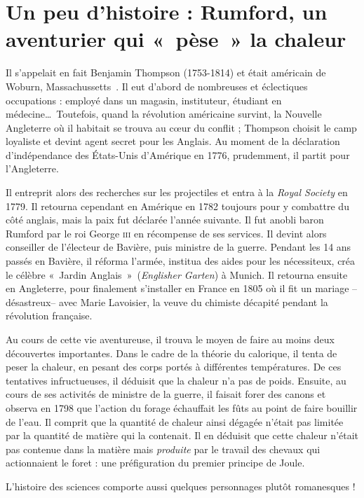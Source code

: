 \atstartofhistorysection
\section[Un peu d’histoire : l’aventurier Rumford]{Un peu d’histoire :\onlyamphibook{\\} Rumford, un aventurier qui «~pèse~» la chaleur}
\label{ch_histoire_rumford_depondt}


	Il s'appelait en fait Benjamin Thompson (1753-1814) et était américain de Woburn, Massachussetts~\cite{millar1996}. Il eut d'abord de nombreuses et éclectiques occupations : employé dans un magasin, instituteur, étudiant en médecine…\ Toutefois, quand la révolution américaine survint, la Nouvelle Angleterre où il habitait se trouva au cœur du conflit ; Thompson choisit le camp loyaliste et devint agent secret pour les Anglais. Au moment de la déclaration d'indépendance des États-Unis d'Amérique en 1776, prudemment, il partit pour l'Angleterre.

	Il entreprit alors des recherches sur les projectiles et entra à la \textit{Royal Society} en 1779. Il retourna cependant en Amérique en 1782 toujours pour y combattre du côté anglais, mais la paix fut déclarée l'année suivante. Il fut anobli baron Rumford par le roi George \textsc{iii} en récompense de ses services. Il devint alors conseiller de l'électeur de Bavière, puis ministre de la guerre. Pendant les 14 ans passés en Bavière, il réforma l'armée, institua des aides pour les nécessiteux, créa le célèbre «~Jardin Anglais~»\ (\textit{Englisher Garten}) à Munich. Il retourna ensuite en Angleterre, pour finalement s'installer en France en 1805 où il fit un mariage --désastreux-- avec Marie Lavoisier, la veuve du chimiste décapité pendant la révolution française.

	Au cours de cette vie aventureuse, il trouva le moyen de faire au moins deux découvertes importantes. Dans le cadre de la théorie du calorique, il tenta de peser la chaleur, en pesant des corps portés à différentes températures. De ces tentatives infructueuses, il déduisit que la chaleur n'a pas de poids. Ensuite, au cours de ses activités de ministre de la guerre, il faisait forer des canons et observa en 1798 que l'action du forage échauffait les fûts au point de faire bouillir de l'eau. Il comprit que la quantité de chaleur ainsi dégagée n'était pas limitée par la quantité de matière qui la contenait. Il en déduisit que cette chaleur n'était pas contenue dans la matière mais \emph{produite} par le travail des chevaux qui actionnaient le foret : une préfiguration du premier principe de Joule.

	L'histoire des sciences comporte aussi quelques personnages plutôt romanesques !

\atendofhistorysection
